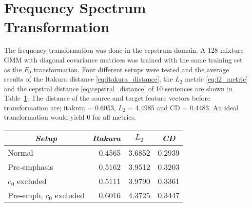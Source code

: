 \section{Frequency Spectrum Transformation} %
\label{sec:frequency_transformation}
The frequency transformation was done in the cepstrum domain. A 128 mixture GMM with diagonal covariance matrices was trained with the same training set as the $F_0$ transformation. Four different setups were tested and the average results of the Itakura distance \eqref{eq:itakura_distance}, the $L_2$ metric \eqref{eq:l2_metric} and the cepstral distance \eqref{eq:cepstral_distance} of 10 sentences are shown in Table~\ref{tab:absolute_freq_results}. The distance of the source and target feature vectors before transformation are; itakura = 0.6053, $L_2$ = 4.4985 and CD = 0.4483. An ideal transformation would yield 0 for all metrics.
\begin{table}[htbp]
	\begin{center}
		\label{tab:absolute_freq_results}
		\begin{tabular}{lrrr}
			\toprule
			\multicolumn{1}{c}{\emph{Setup}} & \multicolumn{1}{c}{\emph{Itakura}} & \multicolumn{1}{c}{\emph{$L_2$}} & \multicolumn{1}{c}{\emph{CD}}\\
			\midrule
			Normal &  0.4565 & 3.6852 & 0.2939 \\
			Pre-emphasis & 0.5162 & 3.9512 & 0.3203 \\
			$c_0$ excluded & 0.5111 & 3.9790 & 0.3361 \\
			Pre-emph, $c_0$ excluded & 0.6016 & 4.3725 & 0.3447 \\
			\bottomrule			
		\end{tabular}		
	\end{center}	
\end{table}



